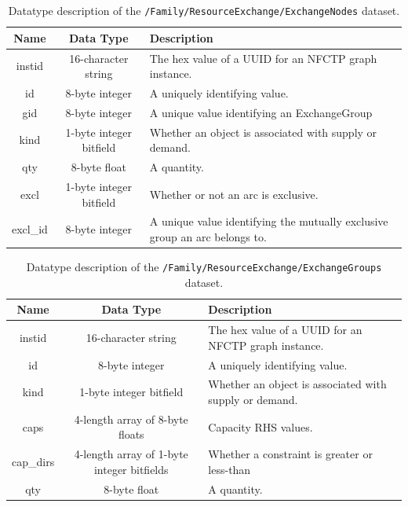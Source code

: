 \begin{table}[h!]
\centering
\label{tbl:/Family/ResourceExchange/ExchangeNodes}
\caption{Datatype description of the \lstinline[basicstyle=\ttfamily\color{black}]|/Family/ResourceExchange/ExchangeNodes| dataset.}
\begin{tabularx}{\columnwidth-10pt}{|c|c|X|} %
\hline
\textbf{Name} & \textbf{Data Type} & \textbf{Description}       \\ \hline
instid & 16-character string & The hex value of a UUID for an NFCTP graph instance. \\ \hline
id & 8-byte integer & A uniquely identifying value. \\ \hline
gid & 8-byte integer & A unique value identifying an ExchangeGroup \\ \hline
kind & 1-byte integer bitfield & Whether an object is associated with supply or demand. \\ \hline
qty & 8-byte float & A quantity. \\ \hline
excl & 1-byte integer bitfield & Whether or not an arc is exclusive. \\ \hline
excl\_id & 8-byte integer & A unique value identifying the mutually exclusive group an arc belongs to. \\ \hline
\end{tabularx}
\end{table}

\begin{table}[h!]
\centering
\label{tbl:/Family/ResourceExchange/ExchangeGroups}
\caption{Datatype description of the \lstinline[basicstyle=\ttfamily\color{black}]|/Family/ResourceExchange/ExchangeGroups| dataset.}
\begin{tabularx}{\columnwidth-10pt}{|c|c|X|} %
\hline
\textbf{Name} & \textbf{Data Type} & \textbf{Description}       \\ \hline
instid & 16-character string & The hex value of a UUID for an NFCTP graph instance. \\ \hline
id & 8-byte integer & A uniquely identifying value. \\ \hline
kind & 1-byte integer bitfield & Whether an object is associated with supply or demand. \\ \hline
caps & 4-length array of 8-byte floats & Capacity RHS values. \\ \hline
cap\_dirs & 4-length array of 1-byte integer bitfields & Whether a constraint is greater or less-than \\ \hline
qty & 8-byte float & A quantity. \\ \hline
\end{tabularx}
\end{table}

